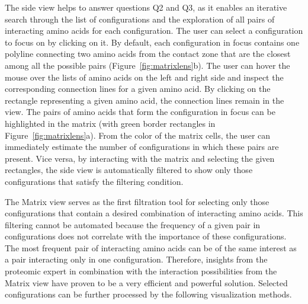 \documentclass{bmcart}
\def\MatView {Matrix view\xspace}
\begin{document}
The side view helps to answer questions Q2 and Q3, as it enables an iterative search through the list of configurations and the exploration of all pairs of interacting amino acids for each configuration.
The user can select a configuration to focus on by clicking on it. 
By default, each configuration in focus contains one polyline connecting two amino acids from the contact zone that are the closest among all the possible pairs (Figure~\ref{fig:matrixlens}b).
The user can hover the mouse over the lists of amino acids on the left and right side and inspect the corresponding connection lines for a given amino acid.
By clicking on the rectangle representing a given amino acid, the connection lines remain in the view. 
The pairs of amino acids that form the configuration in focus can be highlighted in the matrix (with green border rectangles in Figure~\ref{fig:matrixlens}a).
From the color of the matrix cells, the user can immediately estimate the number of configurations in which these pairs are present.
Vice versa, by interacting with the matrix and selecting the given rectangles, the side view is automatically filtered to show only those configurations that satisfy the filtering condition.

The \MatView serves as the first filtration tool for selecting only those configurations that contain a desired combination of interacting amino acids.
This filtering cannot be automated because the frequency of a given pair in configurations does not correlate with the importance of these configurations.
The most frequent pair of interacting amino acids can be of the same interest as a pair interacting only in one configuration.
Therefore, insights from the proteomic expert in combination with the interaction possibilities from the \MatView have proven to be a very efficient and powerful solution.
Selected configurations can be further processed by the following visualization methods.


\end{document}
